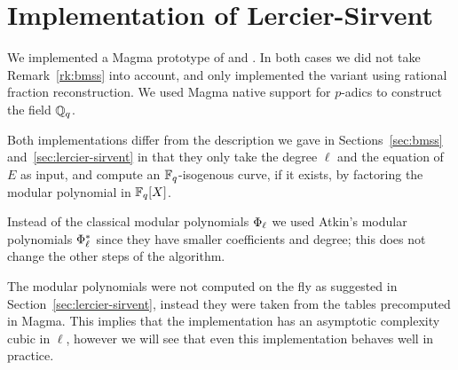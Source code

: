 \section{Implementation of Lercier-Sirvent}
We implemented a Magma prototype of 
and . In both cases we did
not take Remark~\ref{rk:bmss} into account, and only implemented the
variant using rational fraction reconstruction. We used Magma native
support for $p$-adics to construct the field $\mathbb{Q}_q$.

Both implementations differ from the description we gave in
Sections~\ref{sec:bmss} and~\ref{sec:lercier-sirvent} in that they
only take the degree $\ell$ and the equation of $E$ as input, and
compute an $\mathbb{F}_q$-isogenous curve, if it exists, by factoring the
modular polynomial in $\mathbb{F}_q[X]$.

Instead of the classical modular polynomials $\Phi_\ell$ we used
Atkin's modular polynomials $\Phi^\ast_\ell$ since they have
smaller coefficients and degree; this does not change the other steps
of the algorithm.

The modular polynomials were not computed on the fly as suggested in
Section~\ref{sec:lercier-sirvent}, instead they were taken from the
tables precomputed in Magma. This implies that the implementation has
an asymptotic complexity cubic in $\ell$, however we will see that
even this implementation behaves well in practice.


%
